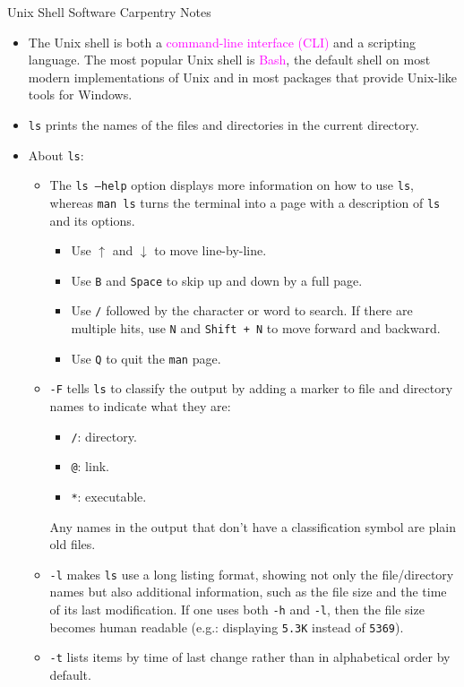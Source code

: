 \documentclass[UTF8]{book}
\date{}
\newcommand{\code}[1]{\colorbox{codegray}{\texttt{#1}}}
\begin{document}
\kaishu
\begin{center}
\Large{Unix Shell Software Carpentry Notes}
\end{center}
\begin{itemize}
\item The Unix shell is both a \textcolor{magenta}{command-line interface (CLI)} and a scripting language. The most popular Unix shell is \textcolor{magenta}{Bash},  the default shell on most modern implementations of Unix and in most packages that provide Unix-like tools for Windows.
\item \code{ls} prints the names of the files and directories in the current directory. 
\item About \code{ls}:
\begin{itemize}
	\item The \code{ls --help} option displays more information on how to use \code{ls}, whereas \code{man ls} turns the terminal into a page with a description of \code{ls} and its options.
\begin{itemize}
	\item Use \code{$\uparrow$} and \code{$\downarrow$} to move line-by-line.
	\item Use \code{B} and \code{Space} to skip up and down by a full page.
	\item Use \code{/} followed by the character or word to search. If there are multiple hits, use \code{N} and \code{Shift + N} to move forward and backward.
	\item Use \code{Q} to quit the \code{man} page.
\end{itemize}
	\item \code{-F} tells \code{ls} to classify the output by adding a marker to file and directory names to indicate what they are:
\begin{itemize}
	\item \code{/}: directory.
	\item \code{@}: link.
	\item \code{*}: executable.
\end{itemize}
Any names in the output that don’t have a classification symbol are plain old files.
	\item \code{-l} makes \code{ls} use a long listing format, showing not only the file/directory names but also additional information, such as the file size and the time of its last modification. If one uses both \code{-h} and \code{-l}, then the file size becomes human readable (e.g.: displaying \code{5.3K} instead of \code{5369}).
	\item \code{-t} lists items by time of last change rather than in alphabetical order by default.

\end{itemize}
\end{itemize}
\end{document}
